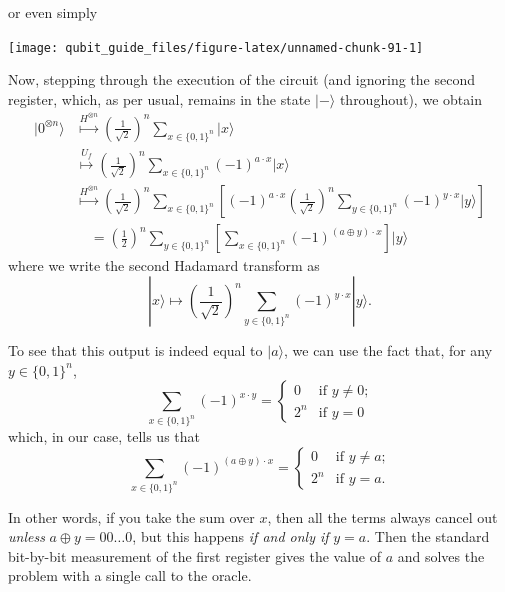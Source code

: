 \documentclass[fleqn,a4paper]{article}
\renewcommand{\footnote}[1]{\sidenotetext[{\color{white}0}\!\!]{\footnotesize #1}}
\theoremstyle{definition}
\theoremstyle{definition}
\theoremstyle{definition}
\theoremstyle{definition}
\theoremstyle{remark}
\begin{document}
or even simply

\begin{center}\texttt{[image: qubit\_guide\_files/figure-latex/unnamed-chunk-91-1]} \end{center}

Now, stepping through the execution of the circuit (and ignoring the second register, which, as per usual, remains in the state \(|-\rangle\) throughout), we obtain
\[
  \begin{aligned}
    |0^{\otimes n}\rangle
    &\overset{H^{\otimes n}}{\longmapsto}
    \left(\frac{1}{\sqrt{2}}\right)^n \sum_{x\in\{0,1\}^n} |x\rangle
  \\&\overset{U_f}{\longmapsto}
    \left(\frac{1}{\sqrt{2}}\right)^n \sum_{x\in\{0,1\}^n} (-1)^{a\cdot x}|x\rangle
  \\&\overset{H^{\otimes n}}{\longmapsto}
    \left(\frac{1}{\sqrt{2}}\right)^n \sum_{x\in\{0,1\}^n}
    \left[
      (-1)^{a\cdot x} \left(\frac{1}{\sqrt{2}}\right)^n
      \sum_{y\in\{0,1\}^n} (-1)^{y\cdot x} |y\rangle
    \right]
  \\&\quad= \left(\frac{1}{2}\right)^n \sum_{y\in\{0,1\}^n}
    \left[
      \sum_{x\in\{0,1\}^n} (-1)^{(a\oplus y)\cdot x}
    \right]
    |y\rangle
  \end{aligned}
\]
where we write the second Hadamard transform as
\[
  |x\rangle
  \longmapsto
  \left(\frac{1}{\sqrt{2}}\right)^n \sum_{y\in\{0,1\}^n} (-1)^{y\cdot x}|y\rangle.
\]

To see that this output is indeed equal to \(|a\rangle\), we can use the fact\footnote{\textbf{Exercise.} Prove this!} that, for any \(y\in\{0,1\}^n\),
\[
  \sum_{x\in\{0,1\}^n} (-1)^{x\cdot y}
  = \begin{cases}
    0 &\text{if $y\neq0$;}
  \\2^n &\text{if $y=0$}
  \end{cases}
\]
which, in our case, tells us that
\[
  \sum_{x\in\{0,1\}^n} (-1)^{(a\oplus y)\cdot x}
  = \begin{cases}
    0 &\text{if $y\neq a$;}
  \\2^n &\text{if $y=a$.}
  \end{cases}
\]

In other words, if you take the sum over \(x\), then all the terms always cancel out \emph{unless} \(a\oplus y = 00\ldots0\), but this happens \emph{if and only if} \(y=a\).
Then the standard bit-by-bit measurement of the first register gives the value of \(a\) and solves the problem with a single call to the oracle.
\end{document}
